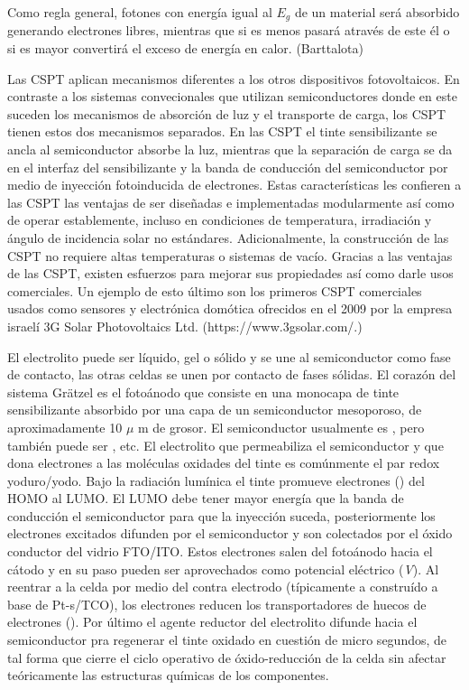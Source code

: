 Como regla general, fotones con energía igual al $E_g$ de un material será absorbido generando electrones libres, mientras que si es menos pasará através de este él o si es mayor convertirá el exceso de energía en calor. (Barttalota)



Las CSPT aplican mecanismos diferentes a los otros dispositivos fotovoltaicos. En contraste a los sistemas convecionales que utilizan semiconductores donde en este suceden los mecanismos de absorción de luz y el transporte de carga, los CSPT tienen estos dos mecanismos separados. En las CSPT el tinte sensibilizante se ancla al semiconductor absorbe la luz, mientras que la separación de carga se da en el interfaz del sensibilizante y la banda de conducción del semiconductor por medio de inyección fotoinducida de electrones. Estas características les confieren a las CSPT las ventajas de ser diseñadas e implementadas modularmente así como de operar establemente, incluso en condiciones de temperatura, irradiación y ángulo de incidencia solar no estándares. Adicionalmente, la construcción de las CSPT no requiere altas temperaturas o sistemas de vacío. Gracias a las ventajas de las CSPT, existen esfuerzos para mejorar sus propiedades así como darle usos comerciales. Un ejemplo de esto último son los primeros CSPT comerciales usados como sensores y electrónica domótica ofrecidos en el 2009 por la empresa israelí 3G Solar Photovoltaics Ltd.  (https://www.3gsolar.com/.)



El electrolito puede ser líquido, gel o sólido y se une al semiconductor como fase de contacto, las otras celdas se unen por contacto de fases sólidas. 
El corazón del sistema Grätzel es el fotoánodo que consiste en una monocapa de tinte sensibilizante absorbido por una capa de un semiconductor mesoporoso, de aproximadamente 10 $\mu$ m de grosor. El semiconductor usualmente es , pero también puede ser , etc. El electrolito que permeabiliza el semiconductor y que dona electrones a las moléculas oxidades del tinte es comúnmente el par redox yoduro/yodo.
Bajo la radiación lumínica el tinte promueve electrones () del HOMO al LUMO. El LUMO debe tener mayor energía que la banda de conducción el semiconductor para que la inyección suceda, posteriormente los electrones excitados difunden por el semiconductor y son colectados por el óxido conductor del vidrio FTO/ITO. Estos electrones salen del fotoánodo hacia el cátodo y en su paso pueden ser aprovechados como potencial eléctrico (\textit{V}). Al reentrar a la celda por medio del contra electrodo (típicamente a construído a base de Pt-s/TCO), los electrones reducen los transportadores de huecos de electrones (). Por último el agente reductor del electrolito difunde hacia el semiconductor pra regenerar el tinte oxidado en cuestión de micro segundos, de tal forma que cierre el ciclo operativo de óxido-reducción de la celda sin afectar teóricamente las estructuras químicas de los componentes.

